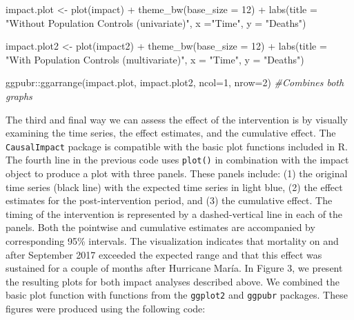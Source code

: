 \documentclass[12pt]{article}
\newenvironment{Shaded}{\begin{snugshade}}{\end{snugshade}}
\newcommand{\AttributeTok}[1]{\textcolor[rgb]{0.77,0.63,0.00}{#1}}
\newcommand{\CommentTok}[1]{\textcolor[rgb]{0.56,0.35,0.01}{\textit{#1}}}
\newcommand{\DecValTok}[1]{\textcolor[rgb]{0.00,0.00,0.81}{#1}}
\newcommand{\FunctionTok}[1]{\textcolor[rgb]{0.00,0.00,0.00}{#1}}
\newcommand{\NormalTok}[1]{#1}
\newcommand{\OtherTok}[1]{\textcolor[rgb]{0.56,0.35,0.01}{#1}}
\newcommand{\SpecialCharTok}[1]{\textcolor[rgb]{0.00,0.00,0.00}{#1}}
\newcommand{\StringTok}[1]{\textcolor[rgb]{0.31,0.60,0.02}{#1}}
\begin{document}
\begin{Shaded}
\begin{Highlighting}[numbers=left,,]
\NormalTok{impact.plot }\OtherTok{\textless{}{-}}  \FunctionTok{plot}\NormalTok{(impact) }\SpecialCharTok{+}  
  \FunctionTok{theme\_bw}\NormalTok{(}\AttributeTok{base\_size =} \DecValTok{12}\NormalTok{) }\SpecialCharTok{+}
  \FunctionTok{labs}\NormalTok{(}\AttributeTok{title =} \StringTok{"Without Population Controls (univariate)"}\NormalTok{, }
       \AttributeTok{x =}\StringTok{"Time"}\NormalTok{, }
       \AttributeTok{y =} \StringTok{"Deaths"}\NormalTok{)}

\NormalTok{impact.plot2 }\OtherTok{\textless{}{-}} \FunctionTok{plot}\NormalTok{(impact2) }\SpecialCharTok{+}  
  \FunctionTok{theme\_bw}\NormalTok{(}\AttributeTok{base\_size =} \DecValTok{12}\NormalTok{) }\SpecialCharTok{+}
  \FunctionTok{labs}\NormalTok{(}\AttributeTok{title =} \StringTok{"With Population Controls (multivariate)"}\NormalTok{, }
       \AttributeTok{x =} \StringTok{"Time"}\NormalTok{, }
       \AttributeTok{y =} \StringTok{"Deaths"}\NormalTok{)}

\NormalTok{ggpubr}\SpecialCharTok{::}\FunctionTok{ggarrange}\NormalTok{(impact.plot, }
\NormalTok{                  impact.plot2, }
                  \AttributeTok{ncol=}\DecValTok{1}\NormalTok{, }
                  \AttributeTok{nrow=}\DecValTok{2}\NormalTok{) }\CommentTok{\#Combines both graphs }
\end{Highlighting}
\end{Shaded}

The third and final way we can assess the effect of the intervention is
by visually examining the time series, the effect estimates, and the
cumulative effect. The \texttt{CausalImpact} package is compatible with
the basic plot functions included in R. The fourth line in the previous
code uses \texttt{plot()} in combination with the impact object to
produce a plot with three panels. These panels include: (1) the original
time series (black line) with the expected time series in light blue,
(2) the effect estimates for the post-intervention period, and (3) the
cumulative effect. The timing of the intervention is represented by a
dashed-vertical line in each of the panels. Both the pointwise and
cumulative estimates are accompanied by corresponding 95\% intervals.
The visualization indicates that mortality on and after September 2017
exceeded the expected range and that this effect was sustained for a
couple of months after Hurricane María. In Figure 3, we present the
resulting plots for both impact analyses described above. We combined
the basic plot function with functions from the \texttt{ggplot2} and
\texttt{ggpubr} packages. These figures were produced using the
following code:
\end{document}
